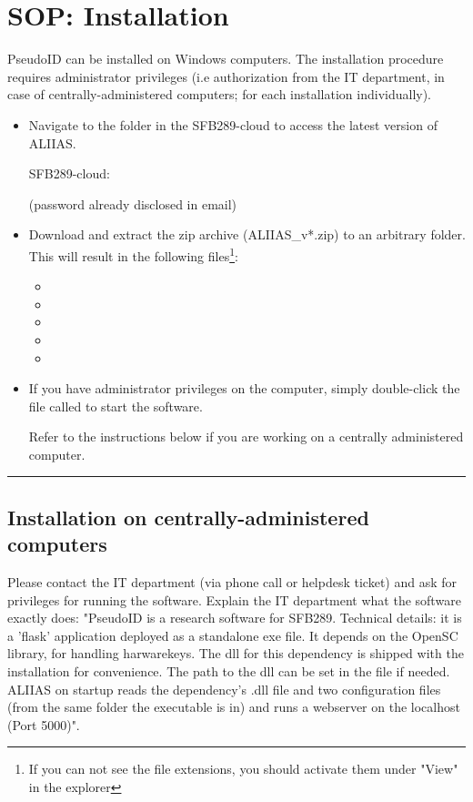 \section{SOP: Installation}
\label{section:sop_installation}
PseudoID can be installed on Windows computers. The installation procedure requires administrator privileges (i.e authorization from the IT department, in case of centrally-administered computers; for each installation individually).

\begin{itemize}
    \item Navigate to the  folder in the SFB289-cloud to access the latest version of ALIIAS.
    
    SFB289-cloud: \href{https://uni-duisburg-essen.sciebo.de/s/yYzEg59bvl8focL}{\color{pniblue}{https://uni-duisburg-essen.sciebo.de/s/yYzEg59bvl8focL}}
    
    (password already disclosed in email)
    
    \item Download and extract the zip archive (ALIIAS\_v*.zip) to an arbitrary folder. This will result in the following files\footnote{If you can not see the file extensions, you should activate them under "View" in the explorer}: 
    \begin{itemize}
        \item {}
        \item {}
        \item {}
        \item {} 
        \item {}
    \end{itemize}
    \item If you have administrator privileges on the computer, simply double-click the file called  to start the software.
    
    Refer to the instructions below if you are working on a centrally administered computer.
\end{itemize} 
\par\noindent\rule{\textwidth\color{pniblue}}{0.4pt}

\subsection*{Installation on centrally-administered computers}

Please contact the IT department (via phone call or helpdesk ticket) and ask for privileges for running the software. Explain the IT department what the software exactly does: "PseudoID is a research software for SFB289. Technical details: it is a 'flask' application deployed as a standalone exe file. It depends on the OpenSC library, for handling harwarekeys. The dll for this dependency is shipped with the installation for convenience. The path to the dll can be set in the file  if needed. ALIIAS on startup reads the dependency's .dll file and two configuration files (from the same folder the executable is in) and runs a webserver on the localhost (Port 5000)".

